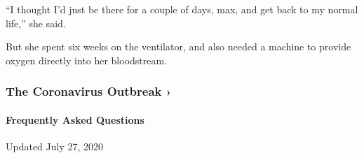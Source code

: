 ``I thought I'd just be there for a couple of days, max, and get back to
my normal life,'' she said.

But she spent six weeks on the ventilator, and also needed a machine to
provide oxygen directly into her bloodstream.

\href{https://www.nytimes3xbfgragh.onion/news-event/coronavirus?action=click\&pgtype=Article\&state=default\&region=MAIN_CONTENT_3\&context=storylines_faq}{}

\hypertarget{the-coronavirus-outbreak-}{%
\subsubsection{The Coronavirus Outbreak
›}\label{the-coronavirus-outbreak-}}

\hypertarget{frequently-asked-questions}{%
\paragraph{Frequently Asked
Questions}\label{frequently-asked-questions}}

Updated July 27, 2020

